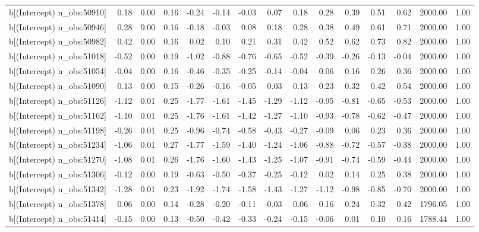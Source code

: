 \begin{table}[ht]
\begin{tabular}{rrrrrrrrrrrrrrr}
  b[(Intercept) n\_obs:50910] & 0.18 & 0.00 & 0.16 & -0.24 & -0.14 & -0.03 & 0.07 & 0.18 & 0.28 & 0.39 & 0.51 & 0.62 & 2000.00 & 1.00 \\ 
  b[(Intercept) n\_obs:50946] & 0.28 & 0.00 & 0.16 & -0.18 & -0.03 & 0.08 & 0.18 & 0.28 & 0.38 & 0.49 & 0.61 & 0.71 & 2000.00 & 1.00 \\ 
  b[(Intercept) n\_obs:50982] & 0.42 & 0.00 & 0.16 & 0.02 & 0.10 & 0.21 & 0.31 & 0.42 & 0.52 & 0.62 & 0.73 & 0.82 & 2000.00 & 1.00 \\ 
  b[(Intercept) n\_obs:51018] & -0.52 & 0.00 & 0.19 & -1.02 & -0.88 & -0.76 & -0.65 & -0.52 & -0.39 & -0.26 & -0.13 & -0.04 & 2000.00 & 1.00 \\ 
  b[(Intercept) n\_obs:51054] & -0.04 & 0.00 & 0.16 & -0.46 & -0.35 & -0.25 & -0.14 & -0.04 & 0.06 & 0.16 & 0.26 & 0.36 & 2000.00 & 1.00 \\ 
  b[(Intercept) n\_obs:51090] & 0.13 & 0.00 & 0.15 & -0.26 & -0.16 & -0.05 & 0.03 & 0.13 & 0.23 & 0.32 & 0.42 & 0.54 & 2000.00 & 1.00 \\ 
  b[(Intercept) n\_obs:51126] & -1.12 & 0.01 & 0.25 & -1.77 & -1.61 & -1.45 & -1.29 & -1.12 & -0.95 & -0.81 & -0.65 & -0.53 & 2000.00 & 1.00 \\ 
  b[(Intercept) n\_obs:51162] & -1.10 & 0.01 & 0.25 & -1.76 & -1.61 & -1.42 & -1.27 & -1.10 & -0.93 & -0.78 & -0.62 & -0.47 & 2000.00 & 1.00 \\ 
  b[(Intercept) n\_obs:51198] & -0.26 & 0.01 & 0.25 & -0.96 & -0.74 & -0.58 & -0.43 & -0.27 & -0.09 & 0.06 & 0.23 & 0.36 & 2000.00 & 1.00 \\ 
  b[(Intercept) n\_obs:51234] & -1.06 & 0.01 & 0.27 & -1.77 & -1.59 & -1.40 & -1.24 & -1.06 & -0.88 & -0.72 & -0.57 & -0.38 & 2000.00 & 1.00 \\ 
  b[(Intercept) n\_obs:51270] & -1.08 & 0.01 & 0.26 & -1.76 & -1.60 & -1.43 & -1.25 & -1.07 & -0.91 & -0.74 & -0.59 & -0.44 & 2000.00 & 1.00 \\ 
  b[(Intercept) n\_obs:51306] & -0.12 & 0.00 & 0.19 & -0.63 & -0.50 & -0.37 & -0.25 & -0.12 & 0.02 & 0.14 & 0.25 & 0.38 & 2000.00 & 1.00 \\ 
  b[(Intercept) n\_obs:51342] & -1.28 & 0.01 & 0.23 & -1.92 & -1.74 & -1.58 & -1.43 & -1.27 & -1.12 & -0.98 & -0.85 & -0.70 & 2000.00 & 1.00 \\ 
  b[(Intercept) n\_obs:51378] & 0.06 & 0.00 & 0.14 & -0.28 & -0.20 & -0.11 & -0.03 & 0.06 & 0.16 & 0.24 & 0.32 & 0.42 & 1796.05 & 1.00 \\ 
  b[(Intercept) n\_obs:51414] & -0.15 & 0.00 & 0.13 & -0.50 & -0.42 & -0.33 & -0.24 & -0.15 & -0.06 & 0.01 & 0.10 & 0.16 & 1788.44 & 1.00 \\ 

\end{tabular}
\end{table}
